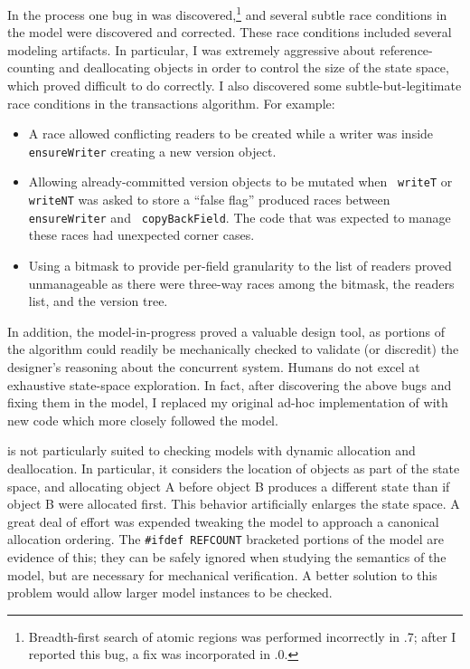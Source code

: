 In the process one bug in \Spin was discovered,\footnote{Breadth-first
search of atomic regions was performed incorrectly in .7;
after I reported this bug, a fix was incorporated in .0.}
and several subtle race conditions in the model were discovered and
corrected.  These race conditions included several modeling artifacts.
In particular, I was extremely aggressive about reference-counting and
deallocating objects in order to control the size of the state space,
which proved difficult to do correctly.  I also discovered some
subtle-but-legitimate race conditions in the transactions algorithm.
For example:
\begin{itemize}
\item A race allowed conflicting readers to be created while a writer
  was inside {\tt ensureWriter} creating a new version object.
\item Allowing already-committed version objects to be mutated when {\tt
    writeT} or {\tt writeNT} was asked to store a ``false flag'' produced
  races between {\tt ensureWriter} and {\tt
    copyBackField}.  The code that was expected to manage these races
  had unexpected corner cases.
\item Using a bitmask to provide per-field granularity
  to the list of readers proved unmanageable as there were three-way
  races among the bitmask, the readers list, and the version tree.
\end{itemize}
In addition, the model-in-progress proved a valuable design tool, as
portions of the algorithm could readily be mechanically checked to
validate (or discredit) the designer's reasoning about the concurrent
system.  Humans do not excel at exhaustive state-space exploration.
In fact, after discovering the above bugs and fixing them in the
model, I replaced my original ad-hoc implementation of \apex with new
code which more closely followed the model.

\Spin is not particularly suited to checking models with dynamic
allocation and deallocation.  In particular, it considers the
location of objects as part of the state space, and allocating object
A before object B produces a different state than if object B
were allocated first.  This behavior artificially enlarges the
state space.  A great deal of effort was expended tweaking the
model to approach a canonical allocation ordering.  The
\texttt{\#ifdef REFCOUNT} bracketed portions of the model are evidence
of this; they
can be safely ignored when studying the semantics of the model, but
are necessary for mechanical verification.  A better solution
to this problem would allow larger model instances to be checked.


